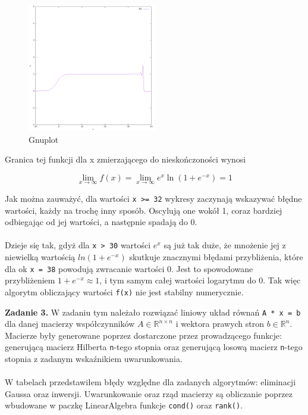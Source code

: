 \documentclass[15pt, a4paper]{article}
\begin{document}
\begin{figure}[h]
    \centering
    \includegraphics[width=0.5\textwidth]{img/gnuplot1.png}
    \caption{Gnuplot}
\end{figure}

\vspace{0.5cm}

\noindent Granica tej funkcji dla x zmierzającego do nieskończoności wynosi 

\[
\lim_{x \to \infty} f(x) = \lim_{x \to \infty} e^x \ln(1 + e^{-x}) = 1
\]

\noindent Jak można zauważyć, dla wartości \verb|x >= 32| wykresy zaczynają wskazywać błędne wartości, każdy na trochę inny sposób. Oscylują one wokół 1, coraz bardziej odbiegając od jej wartości, a następnie spadają do 0. \\\\

\noindent Dzieje się tak, gdyż dla \verb|x > 30| wartości $e^{x}$ są już tak duże, że mnożenie jej z niewielką wartością $ln(1 + e^{-x})$ skutkuje znacznymi błędami przybliżenia, które dla ok \verb|x = 38| powodują zwracanie wartości 0. Jest to spowodowane przybliżeniem $1 + e^{-x} \approx 1$, i tym samym całej wartości logarytmu do 0. Tak więc algorytm obliczający wartości \verb|f(x)| nie jest stabilny numerycznie.

\vspace{0.5cm}

\pagebreak

\noindent\hrulefill


\vspace{0.5cm}

\noindent\textbf{Zadanie 3.} W zadaniu tym należało rozwiązać liniowy układ równań \verb|A * x = b| dla danej macierzy współczynników \( A \in \mathbb{R}^{n \times n} \) i wektora prawych stron \( b \in \mathbb{R}^n \). Macierze były generowane poprzez dostarczone przez prowadzącego funkcje: generującą macierz Hilberta \verb|n|-tego stopnia oraz generującą losową macierz \verb|n|-tego stopnia z zadanym wskaźnikiem uwarunkowania.\\\\
W tabelach przedstawiłem błędy względne dla zadanych algorytmów: eliminacji Gaussa oraz inwersji. Uwarunkowanie oraz rząd macierzy są obliczanie poprzez wbudowane w paczkę LinearAlgebra funkcje \verb|cond()| oraz \verb|rank()|.
\end{document}
